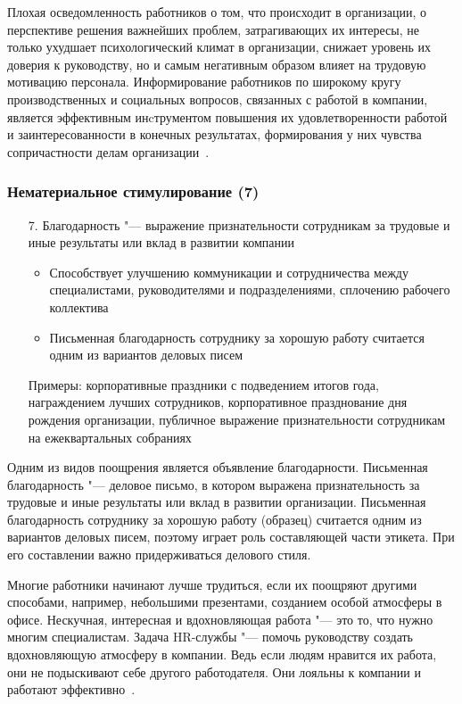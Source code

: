 \documentclass{../industrial-development}
\begin{document}
\lecturenotes

Плохая осведомленность работников о том, что происходит в организации, о перспективе решения важнейших проблем, затрагивающих их интересы, не только ухудшает психологический климат в организации, снижает уровень их доверия к руководству, но и самым негативным образом влияет на трудовую мотивацию персонала. Информирование работников по широкому кругу производственных и социальных вопросов, связанных с работой в компании, является эффективным инcтрументом повышения их удовлетворенности работой и заинтересованности в конечных результатах, формирования у них чувства сопричастности делам организации~\cite{VchemosobenIT}.


\begin{frame} \frametitle{Нематериальное стимулирование (7)}
	\begin{itemize}
		\item[7.] \alert{Благодарность} "--- выражение признательности сотрудникам за трудовые и иные результаты или вклад в развитии компании
		\begin{itemize}
			\item Способствует улучшению коммуникации и сотрудничества между специалистами, руководителями и подразделениями, сплочению рабочего коллектива
			\item Письменная благодарность сотруднику за хорошую работу  считается одним из вариантов деловых писем
		\end{itemize}
		Примеры: корпоративные праздники с подведением итогов года, награждением лучших сотрудников, корпоративное празднование дня рождения организации, публичное выражение признательности сотрудникам на ежеквартальных собраниях			
	\end{itemize}
\end{frame}

\lecturenotes

Одним из видов поощрения является объявление благодарности. Письменная благодарность "--- деловое письмо, в котором выражена признательность за трудовые и иные результаты или вклад в развитии организации. Письменная благодарность сотруднику за хорошую работу (образец) считается одним из вариантов деловых писем, поэтому играет роль составляющей части этикета. При его составлении важно придерживаться делового стиля.

Многие работники начинают лучше трудиться, если их поощряют другими способами, например, небольшими презентами, созданием особой атмосферы в офисе. Нескучная, интересная и вдохновляющая работа "--- это то, что нужно многим специалистам. Задача HR-службы "--- помочь руководству создать вдохновляющую атмосферу в компании. Ведь если людям нравится их работа, они не подыскивают себе другого работодателя. Они лояльны к компании и работают эффективно~\cite{VchemosobenIT}.
\end{document}
